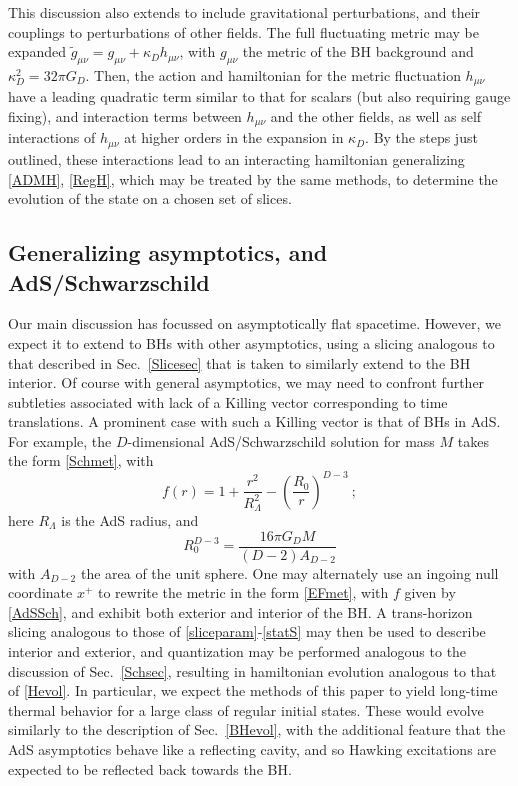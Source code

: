 \documentclass[12pt]{article}
\numberwithin{equation}{section}
\newcommand{\beq}{\begin{equation}}
\newcommand{\eeq}{\end{equation}}
\begin{document}
This discussion also extends to include gravitational perturbations, and their couplings to perturbations of other fields.  The full fluctuating metric may be expanded $\tilde g_{\mu\nu} = g_{\mu\nu}+ \kappa_D h_{\mu\nu}$, with $g_{\mu\nu}$ the metric of the BH background and $\kappa_D^2 =32\pi G_D$.  Then, the action and hamiltonian for the metric fluctuation $h_{\mu\nu}$ have a leading quadratic term similar to that for scalars (but also requiring gauge fixing), and interaction terms between $h_{\mu\nu}$ and the other fields, as well as self interactions of $h_{\mu\nu}$ at higher orders in the expansion in $\kappa_D$.  By the steps just outlined, these interactions lead to an interacting hamiltonian generalizing \eqref{ADMH},  \eqref{RegH}, which may be treated by the same methods, to determine the evolution of the state on a chosen set of slices.  

\subsection{Generalizing asymptotics, and AdS/Schwarzschild}

Our main discussion has focussed on asymptotically flat spacetime.  However, we expect it to extend to BHs with other asymptotics, using a slicing analogous to that described in Sec.~\ref{Slicesec} that is taken to similarly extend to the BH interior.  Of course with general asymptotics, we may need to confront further subtleties associated with lack of a Killing vector corresponding to time translations.  A prominent case with such a Killing vector is that of BHs in AdS.  For example, the $D$-dimensional AdS/Schwarzschild solution for mass $M$ takes the form \eqref{Schmet}, with
\beq\label{AdSSch}
f(r) = 1 + \frac{r^2}{R_\Lambda^2} - \left(\frac{R_0}{r}\right)^{D-3}\ ;
\eeq
here $R_\Lambda$ is the AdS radius, and 
\beq
R_0^{D-3} = \frac{16\pi G_D M}{(D-2)A_{D-2}}
\eeq
with $A_{D-2}$ the area of the unit sphere.  One may alternately use an ingoing null coordinate $x^+$ to rewrite the metric in the form \eqref{EFmet}, with $f$ given by \eqref{AdSSch}, and exhibit both exterior and interior of the BH.  A trans-horizon slicing analogous to those of \eqref{sliceparam}-\eqref{statS} may then be used to describe interior and exterior, and quantization may be performed analogous to the discussion of Sec.~\ref{Schsec}, resulting in  hamiltonian evolution analogous to that of \eqref{Hevol}.  In particular, we expect the methods of this paper to yield long-time thermal behavior for a large class of regular initial states.  These would evolve similarly to the description of  Sec.~\ref{BHevol}, with the additional feature that the AdS asymptotics behave like a reflecting cavity, and so Hawking excitations are expected to be reflected back towards the BH.  
\end{document}
